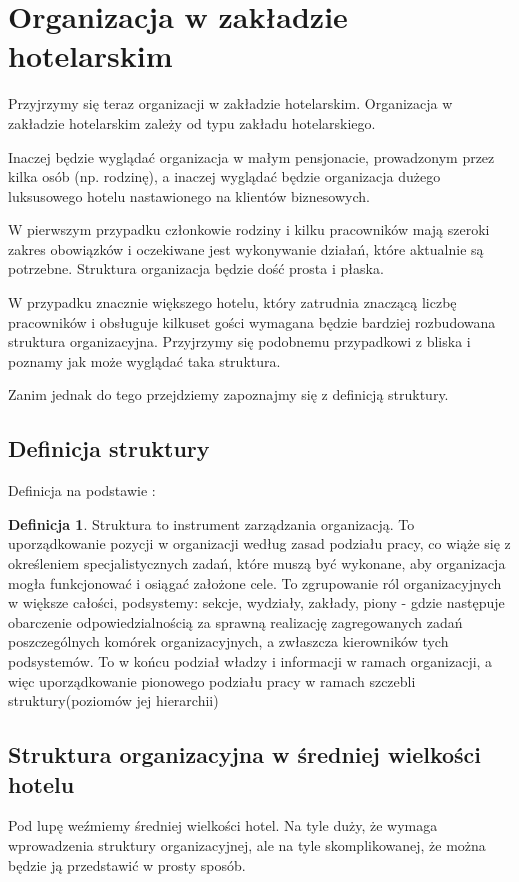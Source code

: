 \documentclass[a4paper,onecolumn,oneside,11pt,wide,floatssmall]{mwrep}
\theoremstyle{definition}
\newtheorem{defn}{Definicja}[section]
\theoremstyle{plain}%
\theoremstyle{remark}
\begin{document}
\section{Organizacja w zakładzie hotelarskim}
Przyjrzymy się teraz organizacji w zakładzie hotelarskim. Organizacja w zakładzie hotelarskim zależy od typu zakładu hotelarskiego. 

Inaczej będzie wyglądać organizacja w małym pensjonacie, prowadzonym przez 
kilka osób (np. rodzinę), a inaczej wyglądać będzie organizacja dużego 
luksusowego hotelu nastawionego na klientów biznesowych. 

W pierwszym przypadku członkowie rodziny i kilku pracowników mają szeroki zakres obowiązków i oczekiwane jest wykonywanie działań, które aktualnie są potrzebne. Struktura organizacja będzie dość prosta i płaska.

W przypadku znacznie większego hotelu, który zatrudnia znaczącą liczbę pracowników i obsługuje kilkuset gości wymagana będzie bardziej rozbudowana struktura organizacyjna. Przyjrzymy się podobnemu przypadkowi z bliska i poznamy jak może wyglądać taka struktura. 

Zanim jednak do tego przejdziemy zapoznajmy się z definicją struktury.

\subsection{Definicja struktury}
Definicja na podstawie \cite{bk:def-struktury}:
\begin{defn}{Struktura} 
to instrument zarządzania organizacją. To uporządkowanie pozycji w organizacji według zasad podziału pracy, co wiąże się z określeniem specjalistycznych zadań, które muszą być wykonane, aby organizacja mogła funkcjonować i osiągać założone cele. To zgrupowanie ról organizacyjnych w większe całości, podsystemy: sekcje, wydziały, zakłady, piony - gdzie następuje obarczenie odpowiedzialnością za sprawną realizację zagregowanych zadań poszczególnych komórek organizacyjnych, a zwłaszcza kierowników tych podsystemów. To w końcu podział władzy i informacji w ramach organizacji, a więc uporządkowanie pionowego podziału pracy w ramach szczebli struktury(poziomów jej hierarchii)
\end{defn}

\subsection{Struktura organizacyjna w średniej wielkości hotelu}
Pod lupę weźmiemy średniej wielkości hotel. Na tyle duży, że wymaga wprowadzenia struktury organizacyjnej, ale na tyle skomplikowanej, że można będzie ją przedstawić w prosty sposób.
\end{document}
